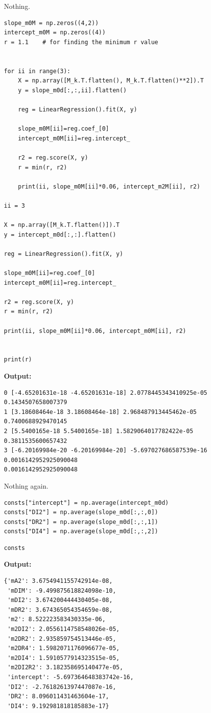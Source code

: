 \documentclass{article}
\begin{document}
Nothing.

\begin{lstlisting}
slope_m0M = np.zeros((4,2))
intercept_m0M = np.zeros((4))
r = 1.1    # for finding the minimum r value


for ii in range(3):
    X = np.array([M_k.T.flatten(), M_k.T.flatten()**2]).T
    y = slope_m0d[:,:,ii].flatten()

    reg = LinearRegression().fit(X, y)

    slope_m0M[ii]=reg.coef_[0]
    intercept_m0M[ii]=reg.intercept_

    r2 = reg.score(X, y)
    r = min(r, r2)

    print(ii, slope_m0M[ii]*0.06, intercept_m2M[ii], r2)

ii = 3

X = np.array([M_k.T.flatten()]).T
y = intercept_m0d[:,:].flatten()

reg = LinearRegression().fit(X, y)

slope_m0M[ii]=reg.coef_[0]
intercept_m0M[ii]=reg.intercept_

r2 = reg.score(X, y)
r = min(r, r2)

print(ii, slope_m0M[ii]*0.06, intercept_m0M[ii], r2)


print(r)\end{lstlisting}

\textbf{Output:}\begin{verbatim}
0 [-4.65201631e-18 -4.65201631e-18] 2.0778445343410925e-05 0.1434507658007379
1 [3.18608464e-18 3.18608464e-18] 2.968487913445462e-05 0.7400688929470145
2 [5.5400165e-18 5.5400165e-18] 1.5829064017782422e-05 0.3811535600657432
3 [-6.20169984e-20 -6.20169984e-20] -5.697027686587539e-16 0.0016142952925090048
0.0016142952925090048

\end{verbatim}

Nothing again.

\begin{lstlisting}
consts["intercept"] = np.average(intercept_m0d)
consts["DI2"] = np.average(slope_m0d[:,:,0])
consts["DR2"] = np.average(slope_m0d[:,:,1])
consts["DI4"] = np.average(slope_m0d[:,:,2])\end{lstlisting}

\begin{lstlisting}
consts\end{lstlisting}

\textbf{Output:}\begin{verbatim}
{'mA2': 3.6754941155742914e-08,
 'mDIM': -9.499875618824098e-10,
 'mDI2': 3.674200444430405e-08,
 'mDR2': 3.674365054354659e-08,
 'm2': 8.522223583430335e-06,
 'm2DI2': 2.0556114758548026e-05,
 'm2DR2': 2.935859754513446e-05,
 'm2DR4': 1.5982071176096677e-05,
 'm2DI4': 1.5910577914323515e-05,
 'm2DI2R2': 3.182358695140477e-05,
 'intercept': -5.697364648383742e-16,
 'DI2': -2.7618261397447087e-16,
 'DR2': 8.096011431463604e-17,
 'DI4': 9.192981818185883e-17}
\end{verbatim}
\end{document}

